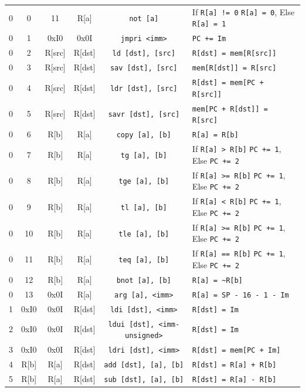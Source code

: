 \documentclass{article}
\begin{document}
\begin{table}[h!]
\begin{footnotesize}
\begin{tabular}{cccc|c|l}
 			0 & 0 & 11 & R[a] & \texttt{not [a]} & If \texttt{R[a] != 0} \texttt{R[a] = 0}, Else \texttt{R[a] = 1} \\
			0 & 1 & 0xI0 & 0x0I & \texttt{jmpri <imm>} & \texttt{PC += Im} \\
			0 & 2 & R[src] & R[dst] & \texttt{ld [dst], [src]} & \texttt{R[dst] = mem[R[src]]} \\
			0 & 3 & R[src] & R[dst] & \texttt{sav [dst], [src]} & \texttt{mem[R[dst]] = R[src]} \\
			0 & 4 & R[src] & R[dst] & \texttt{ldr [dst], [src]} & \texttt{R[dst] = mem[PC + R[src]]} \\
			0 & 5 & R[src] & R[dst] & \texttt{savr [dst], [src]} & \texttt{mem[PC + R[dst]] = R[src]} \\
			0 & 6 & R[b] & R[a] & \texttt{copy [a], [b]} & \texttt{R[a] = R[b]} \\
			0 & 7 & R[b] & R[a] & \texttt{tg [a], [b]} & If \texttt{R[a] > R[b]} \texttt{PC += 1}, Else \texttt{PC += 2} \\
			0 & 8 & R[b] & R[a] & \texttt{tge [a], [b]} & If \texttt{R[a] >= R[b]} \texttt{PC += 1}, Else \texttt{PC += 2} \\
			0 & 9 & R[b] & R[a] & \texttt{tl [a], [b]} & If \texttt{R[a] < R[b]} \texttt{PC += 1}, Else \texttt{PC += 2} \\
			0 & 10 & R[b] & R[a] & \texttt{tle [a], [b]} & If \texttt{R[a] >= R[b]} \texttt{PC += 1}, Else \texttt{PC += 2} \\
			0 & 11 & R[b] & R[a] & \texttt{teq [a], [b]} & If \texttt{R[a] == R[b]} \texttt{PC += 1}, Else \texttt{PC += 2} \\
			0 & 12 & R[b] & R[a] & \texttt{bnot [a], [b]} & \texttt{R[a] = \textasciitilde R[b]} \\
			0 & 13 & 0x0I & R[a] & \texttt{arg [a], <imm>} & \texttt{R[a] = SP - 16 - 1 - Im} \\
			1 & 0xI0 & 0x0I & R[dst] & \texttt{ldi [dst], <imm>} & \texttt{R[dst] = Im} \\
			2 & 0xI0 & 0x0I & R[dst] & \texttt{ldui [dst], <imm-unsigned>} & \texttt{R[dst] = Im} \\
			3 & 0xI0 & 0x0I & R[dst] & \texttt{ldri [dst], <imm>} & \texttt{R[dst] = mem[PC + Im]} \\
			4 & R[b] & R[a] & R[dst] & \texttt{add [dst], [a], [b]} & \texttt{R[dst] = R[a] + R[b]} \\
			5 & R[b] & R[a] & R[dst] & \texttt{sub [dst], [a], [b]} & \texttt{R[dst] = R[a] - R[b]} \\

\end{tabular}
\end{footnotesize}
\end{table}
\end{document}
